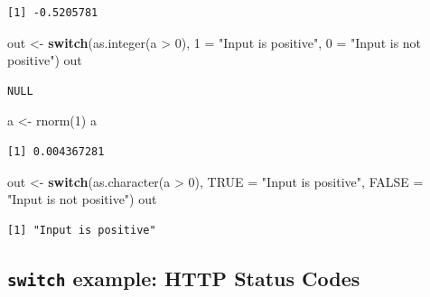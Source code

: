 \documentclass[
]{book}
\newenvironment{Shaded}{\begin{snugshade}}{\end{snugshade}}
\newcommand{\AttributeTok}[1]{\textcolor[rgb]{0.77,0.63,0.00}{#1}}
\newcommand{\ControlFlowTok}[1]{\textcolor[rgb]{0.13,0.29,0.53}{\textbf{#1}}}
\newcommand{\DecValTok}[1]{\textcolor[rgb]{0.00,0.00,0.81}{#1}}
\newcommand{\FunctionTok}[1]{\textcolor[rgb]{0.00,0.00,0.00}{#1}}
\newcommand{\NormalTok}[1]{#1}
\newcommand{\OtherTok}[1]{\textcolor[rgb]{0.56,0.35,0.01}{#1}}
\newcommand{\SpecialCharTok}[1]{\textcolor[rgb]{0.00,0.00,0.00}{#1}}
\newcommand{\StringTok}[1]{\textcolor[rgb]{0.31,0.60,0.02}{#1}}
\begin{document}
\begin{verbatim}
[1] -0.5205781
\end{verbatim}

\begin{Shaded}
\begin{Highlighting}[]
\NormalTok{out }\OtherTok{\textless{}{-}} \ControlFlowTok{switch}\NormalTok{(}\FunctionTok{as.integer}\NormalTok{(a }\SpecialCharTok{\textgreater{}} \DecValTok{0}\NormalTok{),}
              \StringTok{\textasciigrave{}}\AttributeTok{1}\StringTok{\textasciigrave{}} \OtherTok{=} \StringTok{"Input is positive"}\NormalTok{,}
              \StringTok{\textasciigrave{}}\AttributeTok{0}\StringTok{\textasciigrave{}} \OtherTok{=} \StringTok{"Input is not positive"}\NormalTok{)}
\NormalTok{out}
\end{Highlighting}
\end{Shaded}

\begin{verbatim}
NULL
\end{verbatim}

\begin{Shaded}
\begin{Highlighting}[]
\NormalTok{a }\OtherTok{\textless{}{-}} \FunctionTok{rnorm}\NormalTok{(}\DecValTok{1}\NormalTok{)}
\NormalTok{a}
\end{Highlighting}
\end{Shaded}

\begin{verbatim}
[1] 0.004367281
\end{verbatim}

\begin{Shaded}
\begin{Highlighting}[]
\NormalTok{out }\OtherTok{\textless{}{-}} \ControlFlowTok{switch}\NormalTok{(}\FunctionTok{as.character}\NormalTok{(a }\SpecialCharTok{\textgreater{}} \DecValTok{0}\NormalTok{),}
              \StringTok{\textasciigrave{}}\AttributeTok{TRUE}\StringTok{\textasciigrave{}} \OtherTok{=} \StringTok{"Input is positive"}\NormalTok{,}
              \StringTok{\textasciigrave{}}\AttributeTok{FALSE}\StringTok{\textasciigrave{}} \OtherTok{=} \StringTok{"Input is not positive"}\NormalTok{)}
\NormalTok{out}
\end{Highlighting}
\end{Shaded}

\begin{verbatim}
[1] "Input is positive"
\end{verbatim}

\hypertarget{switch-example-http-status-codes}{%
\subsection{\texorpdfstring{\texttt{switch} example: HTTP Status Codes}{switch example: HTTP Status Codes}}\label{switch-example-http-status-codes}}
\end{document}
